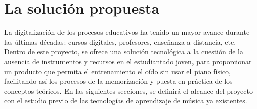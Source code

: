 \section{La solución propuesta}
La digitalización de los procesos educativos ha tenido un mayor avance durante las últimas décadas: cursos digitales, profesores, enseñanza a distancia, etc. Dentro de este proyecto, se ofrece una solución tecnológica a la cuestión de la ausencia de instrumentos y recursos en el estudiantado joven, para proporcionar un producto que permita el entrenamiento el oído sin usar el piano físico, facilitando así los procesos de la memorización y puesta en práctica de los conceptos teóricos. En las siguientes secciones, se definirá el alcance del proyecto con el estudio previo de las tecnologías de aprendizaje de música ya existentes.

